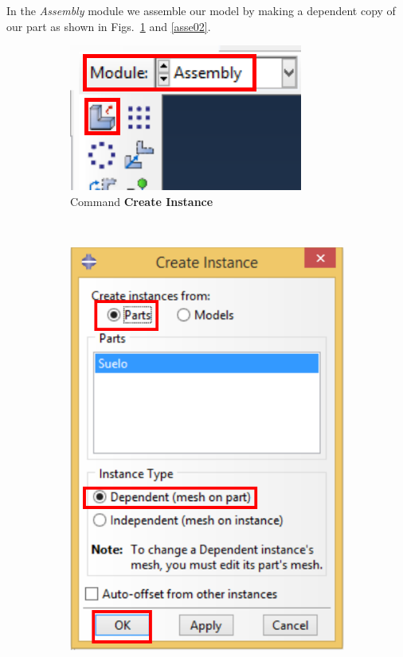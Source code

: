   In the \textit{Assembly} module we assemble our model by making a
  dependent copy of our part as shown in Figs.~\ref{asse01} and
  \ref{asse02}.
  \begin{figure}[!h]
    \centering
    \begin{subfigure}[!h]{0.25\textwidth}
      \includegraphics[width=\textwidth]{./body/images/asse01.pdf}
      \caption{Command \textbf{Create Instance}}
      \label{asse01}
    \end{subfigure}%
    ~ %
    \begin{subfigure}[!h]{0.39\textwidth}
      \includegraphics[width=\textwidth]{./body/images/asse02.pdf}

\end{subfigure}
\end{figure}
